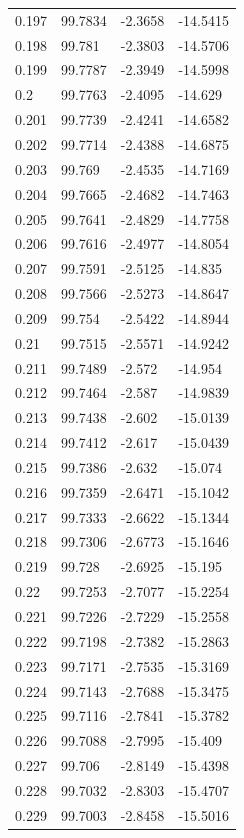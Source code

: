 \begin{tabular}{llll}
0.197 & 99.7834 & -2.3658 & -14.5415 \\
0.198 & 99.781 & -2.3803 & -14.5706 \\
0.199 & 99.7787 & -2.3949 & -14.5998 \\
0.2 & 99.7763 & -2.4095 & -14.629 \\
0.201 & 99.7739 & -2.4241 & -14.6582 \\
0.202 & 99.7714 & -2.4388 & -14.6875 \\
0.203 & 99.769 & -2.4535 & -14.7169 \\
0.204 & 99.7665 & -2.4682 & -14.7463 \\
0.205 & 99.7641 & -2.4829 & -14.7758 \\
0.206 & 99.7616 & -2.4977 & -14.8054 \\
0.207 & 99.7591 & -2.5125 & -14.835 \\
0.208 & 99.7566 & -2.5273 & -14.8647 \\
0.209 & 99.754 & -2.5422 & -14.8944 \\
0.21 & 99.7515 & -2.5571 & -14.9242 \\
0.211 & 99.7489 & -2.572 & -14.954 \\
0.212 & 99.7464 & -2.587 & -14.9839 \\
0.213 & 99.7438 & -2.602 & -15.0139 \\
0.214 & 99.7412 & -2.617 & -15.0439 \\
0.215 & 99.7386 & -2.632 & -15.074 \\
0.216 & 99.7359 & -2.6471 & -15.1042 \\
0.217 & 99.7333 & -2.6622 & -15.1344 \\
0.218 & 99.7306 & -2.6773 & -15.1646 \\
0.219 & 99.728 & -2.6925 & -15.195 \\
0.22 & 99.7253 & -2.7077 & -15.2254 \\
0.221 & 99.7226 & -2.7229 & -15.2558 \\
0.222 & 99.7198 & -2.7382 & -15.2863 \\
0.223 & 99.7171 & -2.7535 & -15.3169 \\
0.224 & 99.7143 & -2.7688 & -15.3475 \\
0.225 & 99.7116 & -2.7841 & -15.3782 \\
0.226 & 99.7088 & -2.7995 & -15.409 \\
0.227 & 99.706 & -2.8149 & -15.4398 \\
0.228 & 99.7032 & -2.8303 & -15.4707 \\
0.229 & 99.7003 & -2.8458 & -15.5016 \\

\end{tabular}
